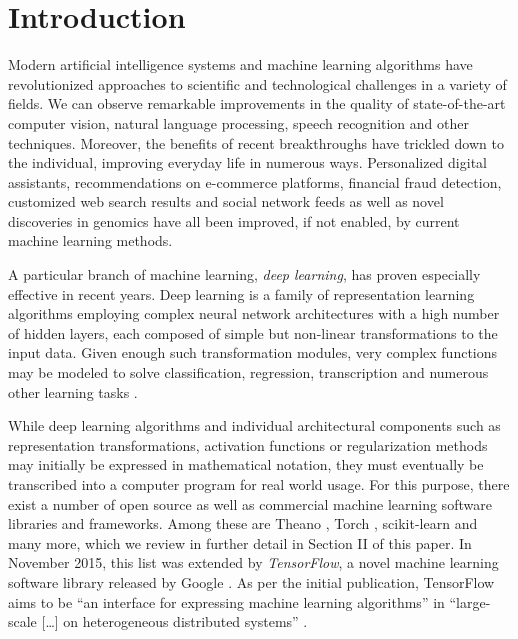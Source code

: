 \section{Introduction}

Modern artificial intelligence systems and machine learning algorithms have
revolutionized approaches to scientific and technological challenges in a
variety of fields. We can observe remarkable improvements in the quality of
state-of-the-art computer vision, natural language processing, speech
recognition and other techniques. Moreover, the benefits of recent breakthroughs
have trickled down to the individual, improving everyday life in numerous
ways. Personalized digital assistants, recommendations on e-commerce platforms,
financial fraud detection, customized web search results and social network
feeds as well as novel discoveries in genomics have all been improved, if not
enabled, by current machine learning methods.

A particular branch of machine learning, \emph{deep learning}, has proven
especially effective in recent years. Deep learning is a family of
representation learning algorithms employing complex neural network
architectures with a high number of hidden layers, each composed of simple but
non-linear transformations to the input data. Given enough such transformation
modules, very complex functions may be modeled to solve classification,
regression, transcription and numerous other learning tasks \cite{nature2015}.

While deep learning algorithms and individual architectural components such as
representation transformations, activation functions or regularization methods
may initially be expressed in mathematical notation, they must eventually be
transcribed into a computer program for real world usage. For this purpose,
there exist a number of open source as well as commercial machine learning
software libraries and frameworks. Among these are Theano \cite{theano}, Torch
\cite{torch}, scikit-learn \cite{scikit} and many more, which we review in
further detail in Section II of this paper. In November 2015, this list was
extended by \emph{TensorFlow}, a novel machine learning software library
released by Google \cite{tensorflow}. As per the initial publication, TensorFlow
aims to be ``an interface for expressing machine learning algorithms'' in
``large-scale [\dots] on heterogeneous distributed systems'' \cite{tensorflow}.

